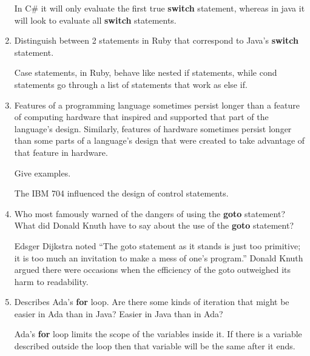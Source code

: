 \begin{enumerate}
\begin{answer}
    In C\# it will only evaluate the first true \textbf{switch} statement, whereas in java it will look to evaluate all \textbf{switch} statements.  

    \end{answer}

  \item Distinguish between 2 statements in Ruby
    that correspond to Java's \textbf{switch} statement.

    \begin{answer}

    Case statements, in Ruby, behave like nested if statements, while cond statements go through a list of statements that work as else if.
    
    \end{answer}

  \item Features of a programming language sometimes persist
    longer than a feature of computing hardware that inspired
    and supported that part of the language's design.
    Similarly, features of hardware sometimes persist longer
    than some parts of a language's design that were created
    to take advantage of that feature in hardware.

    Give examples.

    \begin{answer}
    The IBM 704 influenced the design of control statements.
    \end{answer}

  \item Who most famously warned of the dangers of using the
    \textbf{goto} statement? What did Donald Knuth have to
    say about the use of the \textbf{goto} statement?

    \begin{answer}
    Edsger Dijkstra noted “The goto statement as it stands is just too primitive; it is too much an invitation to make a mess of one’s program.” Donald Knuth argued there were occasions when the efficiency of the goto outweighed its harm to readability.
    \end{answer}

  \item Describes Ada's \textbf{for} loop. Are there some
    kinds of iteration that might be easier in Ada than
    in Java? Easier in Java than in Ada?

    \begin{answer}
    Ada's \textbf{for} loop limits the scope of the variables inside it.  If there is a variable described outside the loop then that variable will be the same after it ends.
    \end{answer}


\end{enumerate}
